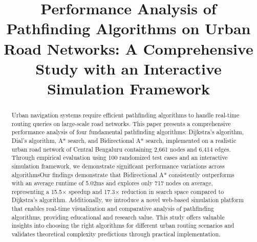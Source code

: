 \documentclass[conference]{IEEEtran}
\begin{document}
\title{Performance Analysis of Pathfinding Algorithms on Urban Road Networks: A Comprehensive Study with an Interactive Simulation Framework}

\author{
  \and
  \and
}

\maketitle

\begin{abstract}
Urban navigation systems require efficient pathfinding algorithms to handle real-time routing queries on large-scale road networks. This paper presents a comprehensive performance analysis of four fundamental pathfinding algorithms: Dijkstra's algorithm, Dial's algorithm, A* search, and Bidirectional A* search, implemented on a realistic urban road network of Central Bengaluru containing 2,661 nodes and 6,414 edges. Through empirical evaluation using 100 randomized test cases and an interactive simulation framework, we demonstrate significant performance variations across algorithmsOur findings demonstrate that Bidirectional A* consistently outperforms with an average runtime of 5.02ms and explores only 717 nodes on average, representing a 15.5× speedup and 17.3× reduction in search space compared to Dijkstra's algorithm. Additionally, we introduce a novel web-based simulation platform that enables real-time visualization and comparative analysis of pathfinding algorithms, providing educational and research value. This study offers valuable insights into choosing the right algorithms for different urban routing scenarios and validates theoretical complexity predictions through practical implementation.
\end{abstract}
\end{document}
